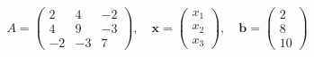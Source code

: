 \documentclass[preview]{standalone}
\begin{document}
\begin{align*}
A = \begin{pmatrix} 2 & 4 & -2 \\ 4 & 9 & -3 \\ -2 & -3 & 7 \end{pmatrix},\quad \mathbf{x} = \begin{pmatrix} x_1 \\ x_2 \\ x_3 \end{pmatrix}, \quad \mathbf{b} = \begin{pmatrix} 2 \\ 8 \\ 10 \end{pmatrix}
\end{align*}
\end{document}
